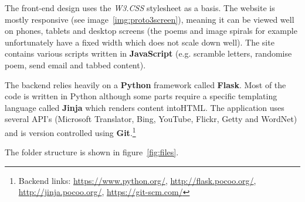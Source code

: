 The front-end design uses the \textit{W3.CSS} stylesheet \autocite{w3css} as a basis. The website is mostly responsive (see image~\ref{img:proto3screen}), meaning it can be viewed well on phones, tablets and desktop screens (the poems and image spirals for example unfortunately have a fixed width which does not scale down well). The site contains various scripts written in \textbf{JavaScript} (e.g. scramble letters, randomise poem, send email and tabbed content).

The backend relies heavily on a \textbf{Python} framework called \textbf{Flask}. Most of the code is written in Python although some parts require a specific templating language called \textbf{Jinja} which renders content into\ac{HTML}. The application uses several \acs{API}'s (Microsoft Translator, Bing, YouTube, Flickr, Getty and WordNet) and is version controlled using \textbf{Git}.\footnote{Backend links: \url{https://www.python.org/}, \url{http://flask.pocoo.org/}, \url{http://jinja.pocoo.org/}, \url{https://git-scm.com/}}

The folder structure is shown in figure~\ref{fig:files}.


